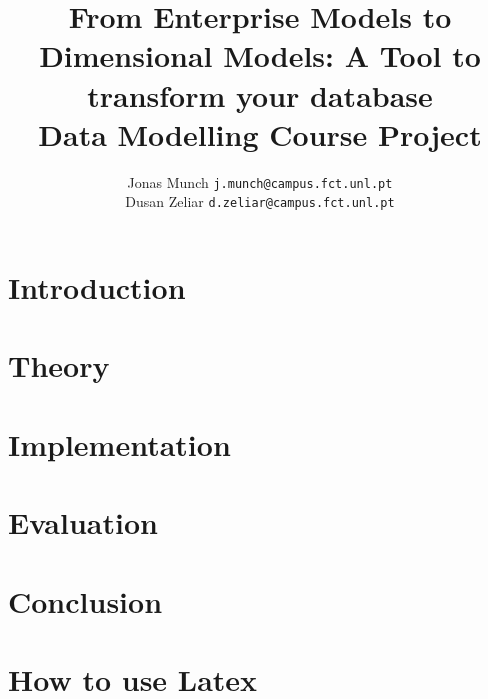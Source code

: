 \documentclass[a4paper, 10 pt, conference]{ieeeconf}
\title{\LARGE \bf
  From Enterprise Models to Dimensional Models: A Tool to transform your database \\
  Data Modelling Course Project
}
\author{
Jonas Munch {\tt\small j.munch@campus.fct.unl.pt} \\
Dusan Zeliar {\tt\small d.zeliar@campus.fct.unl.pt}
}
\begin{document}
\maketitle
\thispagestyle{empty}
\pagestyle{empty}



\begin{abstract}

\end{abstract}


\section{Introduction}
\label{sec:introduction}


\section{Theory}
\label{sec:theory}


\section{Implementation}
\label{sec:implementation}


\section{Evaluation}
\label{sec:evaluation}


\section{Conclusion}
\label{sec:conclusion}


\section{How to use Latex}


\addtolength{\textheight}{0cm}   %
\end{document}
